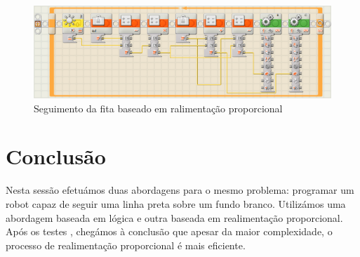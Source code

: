 \documentclass{article}
\begin{document}
\begin{figure}[H]
    \centering
    \includegraphics[scale=.5]{code}
    \caption{Seguimento da fita baseado em ralimentação proporcional}
\end{figure}

\section{Conclusão}
Nesta sessão efetuámos duas abordagens para o mesmo problema: programar um robot
capaz de seguir uma linha preta sobre um fundo branco. Utilizámos uma abordagem
baseada em lógica  e outra baseada em realimentação proporcional. Após os testes
, chegámos à conclusão que apesar da maior complexidade, o processo de
realimentação proporcional é mais eficiente.
\end{document}
